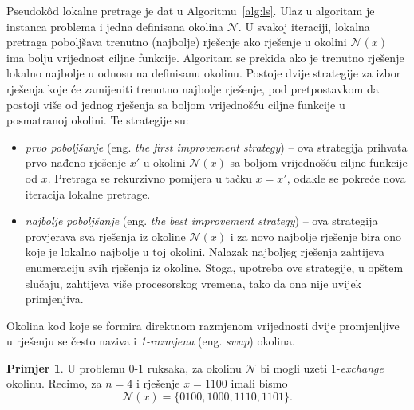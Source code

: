 \documentclass[a4paper, utf8, 11pt, colorlinks]{book}
\theoremstyle{definition}
\newtheorem{primjer}{Primjer}[chapter]
\begin{document}
Pseudok\^od lokalne pretrage je dat u Algoritmu~\ref{alg:ls}. Ulaz u algoritam je instanca problema i jedna definisana okolina $\mathcal{N}$. U svakoj iteraciji, lokalna pretraga poboljšava trenutno (najbolje) rješenje ako    rješenje u okolini  $\mathcal{N}(x)$ ima bolju vrijednost ciljne funkcije. Algoritam se prekida ako je trenutno rješenje lokalno najbolje u odnosu na definisanu okolinu.
 Postoje dvije strategije za izbor rješenja koje će zamijeniti trenutno najbolje rješenje, pod pretpostavkom da postoji više od jednog rješenja sa boljom vrijednošću ciljne funkcije u posmatranoj okolini. Te strategije su:
 \begin{itemize}
 	\item \emph{prvo poboljšanje} (eng. \emph{the first improvement strategy}) -- ova strategija prihvata prvo nađeno rješenje $x'$ u okolini $\mathcal{N}(x)$ sa boljom vrijednošću ciljne funkcije od $x$. Pretraga se rekurzivno pomijera u tačku  $x = x'$, odakle se pokreće nova iteracija lokalne pretrage.
 	\item \emph{najbolje poboljšanje} (eng. \emph{the best improvement strategy}) --   ova strategija provjerava sva rješenja iz okoline $\mathcal{N}(x)$ i za novo najbolje rješenje bira ono koje je lokalno najbolje u toj okolini. Nalazak  najboljeg rješenja zahtijeva enumeraciju svih rješenja iz okoline. Stoga, upotreba ove strategije, u opštem slučaju, zahtijeva više procesorskog vremena, tako da ona nije uvijek primjenjiva. %
 \end{itemize}
  Okolina kod koje se formira direktnom razmjenom vrijednosti dvije promjenljive u rješenju se često naziva i \emph{1-razmjena} (eng. \emph{swap}) okolina.
 \begin{primjer} U   problemu 0-1 ruksaka, za okolinu $\mathcal{N}$ bi mogli uzeti $1$-\emph{exchange} okolinu. Recimo, za $n=4$ i rješenje $x=1100$ imali  bismo $$\mathcal{N}(x)= \{ 0100, 1000, 1110, 1101 \}.$$ 
 	\end{primjer}
  
\end{document}
